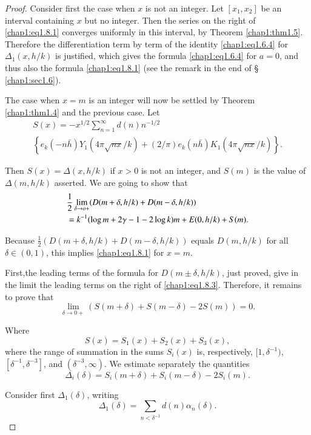 \begin{proof}
Consider first the case when $x$ is not an integer. Let $[x_1,x_2]$ be
an interval containing $x$ but no integer. Then the series on the
right of \eqref{chap1:eq1.8.1} converges uniformly in this interval,
by Theorem \ref{chap1:thm1.5}. Therefore the differentiation term by
term of the identity \eqref{chap1:eq1.6.4} for $\Delta_1(x,h/k)$ is
justified, which gives the formula \eqref{chap1:eq1.6.4} for $a=0$,
and thus also the formula \eqref{chap1:eq1.8.1} (see the remark in the
end of \S ~ \ref{chap1:sec1.6}).

The case when $x=m$ is an integer will now be settled by Theorem
\ref{chap1:thm1.4} and the previous case. Let
\begin{multline*}
  S(x)= -x^{1/2}\sum\limits_{n=1}^\infty d(n)n^{-1/2}\\
  \left\{e_k(-n\bar{h})Y_1(4\pi\sqrt{nx}/k)+(2/\pi)e_k
  (n\bar{h})K_1(4\pi\sqrt{nx}/k)\right\}.
\end{multline*}

Then $S(x)=\Delta(x,h/k)$ if $x>0$ is not an integer, and $S(m)$ is
the value of $\Delta(m,h/k)$ asserted. We are going to show that 
\begin{align}
  & \frac{1}{2}\lim\limits_{\delta\to o +}(D(m+\delta,h/k)+D
  (m-\delta,h/k))\label{chap1:eq1.8.3}\\ 
  & =k^{-1}(\log m+2\gamma-1-2\log k)m+E(0,h/k)+S(m).\notag
\end{align}

Because $\frac{1}{2}(D(m+\delta,h/k)+D(m-\delta,h/k))$ equals
$D(m,h/k)$ for all $\delta\in(0,1)$, this implies
\eqref{chap1:eq1.8.1} for $x=m$. 

First,\pageoriginale the leading terms of the formula for
$D(m\pm\delta,h/k)$, just proved, give in the limit the leading terms
on the right of \eqref{chap1:eq1.8.3}. Therefore, it remains to prove
that 
\begin{equation}\label{chap1:eq1.8.4}
\lim\limits_{\delta\to 0+}(S(m+\delta)+S(m-\delta)-2S(m))=0.
\end{equation}

Where
$$
S(x)=S_1(x)+S_2(x)+S_3(x),
$$
where the range of summation in the sums $S_i(x)$ is, respectively,
$[1,\delta^{-1})$, $[\delta^{-1}, \delta^{-3}]$, and
$(\delta^{-3},\infty)$. We estimate separately the quantities 
$$
\Delta_i(\delta)=S_i(m+\delta)+S_i(m-\delta)-2S_i(m).
$$

Consider first $\Delta_1(\delta)$, writing
$$
\Delta_1(\delta)=\sum\limits_{n<\delta^{-1}}d(n)\alpha_n(\delta).
$$


\end{proof}
